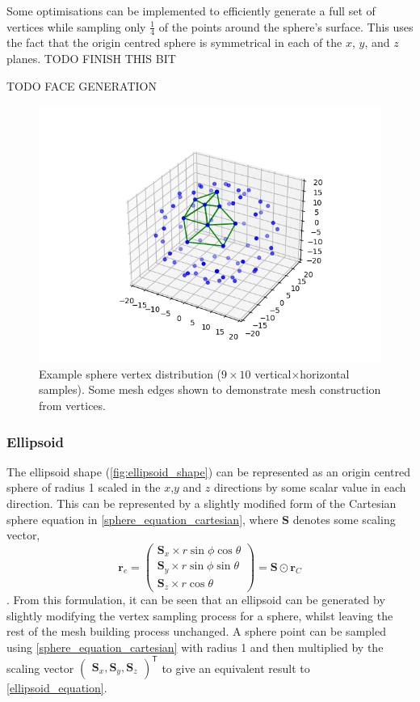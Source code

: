 Some optimisations can be implemented to efficiently generate a full set of vertices while sampling only $\frac{1}{4}$ of the points around the sphere's surface. This uses the fact that the origin centred sphere is symmetrical in each of the $x$, $y$, and $z$ planes. TODO FINISH THIS BIT

TODO FACE GENERATION

\begin{figure}
  \begin{center}
    \includegraphics[width=0.5\linewidth]{assets/images/shapes/sphere_vertices}
    \caption{Example sphere vertex distribution ($9\times10$ vertical$\times$horizontal samples). Some mesh edges shown to demonstrate mesh construction from vertices.}
    \label{fig:sphere_vertices}
  \end{center}
\end{figure}


\subsubsection{Ellipsoid}
The ellipsoid shape (\cref{fig:ellipsoid_shape}) can be represented as an origin centred sphere of radius 1 scaled in the $x$,$y$ and $z$ directions by some scalar value in each direction. This can be represented by a slightly modified form of the Cartesian sphere equation in \cref{sphere_equation_cartesian}, where $\mathbf{S}$ denotes some scaling vector,
\begin{equation}
\mathbf{r}_{e}=\begin{pmatrix}\mathbf{S}_x \times r\sin\phi \cos\theta\\
\mathbf{S}_y \times r\sin\phi \sin\theta\\
\mathbf{S}_z \times r\cos\theta\end{pmatrix}
=\mathbf{S} \odot \mathbf{r}_{C}
\label{ellipsoid_equation}
\end{equation}.
From this formulation, it can be seen that an ellipsoid can be generated by slightly modifying the vertex sampling process for a sphere, whilst leaving the rest of the mesh building process unchanged. A sphere point can be sampled using \cref{sphere_equation_cartesian} with radius 1 and then multiplied by the scaling vector $\begin{pmatrix}\mathbf{S}_x,\mathbf{S}_y,\mathbf{S}_z\end{pmatrix}^\mathsf{T}$ to give an equivalent result to \cref{ellipsoid_equation}.


